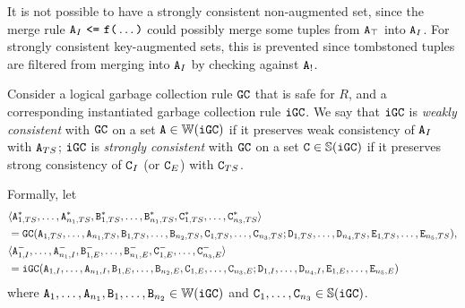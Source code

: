 It is not possible to have a strongly consistent non-augmented set, since the merge rule $\tt{A}_I ~\tt{<=}~ \tt{f}\tt{(}\dots\tt{)}$ could possibly merge some tuples from $\tt{A}_\top$ into $\tt{A}_I$.
For strongly consistent key-augmented sets, this is prevented since tombstoned tuples are filtered from merging into $\tt{A}_I$ by checking against $\tt{A}_!$.


\begin{property}\label{property:instantiated_gc_consistent}
Consider a logical garbage collection rule $\tt{GC}$ that is safe for $R$, and a corresponding instantiated garbage collection rule $\tt{iGC}$.
We say that
$\tt{iGC}$ is \emph{weakly consistent}   with $\tt{GC}$ on a set $\tt{A} \in \mathbb{W}(\tt{iGC})$ if it preserves weak consistency   of $\tt{A}_I$                 with $\tt{A}_{TS}$;
$\tt{iGC}$ is \emph{strongly consistent} with $\tt{GC}$ on a set $\tt{C} \in \mathbb{S}(\tt{iGC})$ if it preserves strong consistency of $\tt{C}_I$ (or $\tt{C}_E$) with $\tt{C}_{TS}$.

Formally, let
\begin{align*}
&\langle
\tt{A}_{1,TS}^*, \dots, \tt{A}_{n_1,TS}^*,
\tt{B}_{1,TS}^*, \dots, \tt{B}_{n_1,TS}^*, 
\tt{C}_{1,TS}^*, \dots, \tt{C}_{n_3,TS}^*
\rangle \\
&= \tt{GC}(
\tt{A}_{1,TS}, \dots, \tt{A}_{n_1,TS},
\tt{B}_{1,TS}, \dots, \tt{B}_{n_2,TS},
\tt{C}_{1,TS}, \dots, \tt{C}_{n_3,TS};
\tt{D}_{1,TS}, \dots, \tt{D}_{n_4,TS},
\tt{E}_{1,TS}, \dots, \tt{E}_{n_5,TS}
),\\
&\langle
\tt{A}_{1,I}^-, \dots, \tt{A}_{n_1,I}^-,
\tt{B}_{1,E}^-, \dots, \tt{B}_{n_1,E}^-,
\tt{C}_{1,E}^-, \dots, \tt{C}_{n_3,E}^-
\rangle\\
&= \tt{iGC}(
\tt{A}_{1,I}, \dots, \tt{A}_{n_1,I},
\tt{B}_{1,E}, \dots, \tt{B}_{n_2,E},
\tt{C}_{1,E}, \dots, \tt{C}_{n_3,E};
\tt{D}_{1,I}, \dots, \tt{D}_{n_4,I},
\tt{E}_{1,E}, \dots, \tt{E}_{n_5,E}
)
\end{align*}
where $\tt{A}_1, \dots, \tt{A}_{n_1}, \tt{B}_1, \dots, \tt{B}_{n_2} \in \mathbb{W}(\tt{iGC})$ and $\tt{C}_1, \dots, \tt{C}_{n_3} \in \mathbb{S}(\tt{iGC})$.


\end{property}
